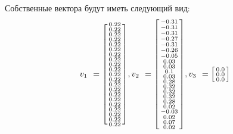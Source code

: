 \documentclass[a4paper,hidelinks,14pt]{extarticle}
\begin{document}
	
	Собственные вектора будут иметь следующий вид:
	$$
	v_{1\phantom{1}}=\begin{bsmallmatrix}
		0.22\\
		0.22\\
		0.22\\
		0.22\\
		0.22\\
		0.22\\
		0.22\\
		0.22\\
		0.22\\
		0.22\\
		0.22\\
		0.22\\
		0.22\\
		0.22\\
		0.22\\
		0.22\\
		0.22\\
		0.22\\
		0.22\\
		0.22\\
		0.22\\
	\end{bsmallmatrix},
	v_{2\phantom{1}}=\begin{bsmallmatrix}
		-0.31\\
		-0.31\\
		-0.31\\
		-0.27\\
		-0.31\\
		-0.26\\
		-0.05\\
		0.03\\ 
		0.03\\ 
		0.1\\  
		0.03\\ 
		0.28\\ 
		0.32\\ 
		0.32\\ 
		0.32\\ 
		0.28\\ 
		0.02\\ 
		-0.03\\
		0.02\\ 
		0.07\\ 
		0.02\\
	\end{bsmallmatrix},
	v_{3\phantom{1}}=\begin{bsmallmatrix}
		 0.0\\  
		0.0\\  
		0.0\\  

\end{bsmallmatrix}$$
\end{document}
